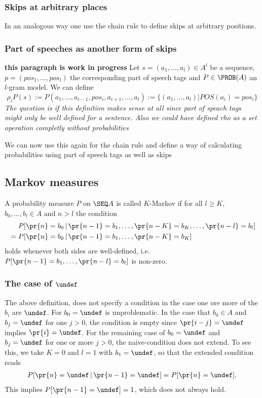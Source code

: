 \documentclass[11pt]{article}
\begin{document}
\subsubsection{Skips at arbitrary places}
In an analogous way one use the chain rule to define skips at arbitrary positions.

\subsubsection{Part of speeches as another form of skips}
\textbf{this paragraph is work in progress}
Let $s=(a_1,\dots,a_l) \in A^l$ be a sequence, $p=(pos_1,\dots,pos_l)$ the corresponding part of speech tags and $P\in \PROB (A)$ an $l$-gram model. 
We can define
\[\rho_iP(s) := P(a_1,\dots,a_{i-1},pos_i,a_{i+1},\dots,a_l):= \{ (a_1,\dots,a_l) | POS(a_i)=pos_i \}\]
\textit{The question is if this definition makes sense at all since part of speach tags might only be well defined for a sentence. Also we could have defined rho as a set operation completly without probabilities}

We can now use this again for the chain rule and define a way of calculating probabilities using part of speech tags as well as skips

\subsection{Markov measures}

A probability measure $P$ on $\SEQ A$ is called $K$-Markov if
for all $l \geq K$, $b_0,\dots,b_l \in A$ and $n > l$ the condition
\begin{align*}
  &  P[ \pr{n} = b_0 \,|\, \pr{n-1} = b_1, \dots, \pr{n-K} = b_K, \dots, \pr{n-l} = b_l ] \\  
 \;=\;&  P[ \pr{n} = b_0 \,|\, \pr{n-1} = b_1, \dots, \pr{n-K} = b_K ]
\end{align*}
holds whenever both sides are well-defined, i.e.
$P[\pr{n-1} = b_1,\dots, \pr{n-l} = b_l ]$ is non-zero.

\subsubsection{The case of $\undef$}
The above definition, does not specify a
condition in the case one ore more of the $b_i$ are $\undef$.
For $b_0=\undef$ is unproblematic. In the case that $b_0 \in A$ and $b_j =
\undef$ for one $j > 0$, the condition is empty since $\pr{i-j} =
\undef$ implies $\pr{i}=\undef$. For the remaining case 
of $b_0 = \undef$ and $b_j = \undef$ for one or more $j > 0$,
the naive-condition does not extend. To see this, we take $K=0$ and
$l=1$ with $b_1 = \undef$, so that the extended condition reads
\begin{align}
P[\pr{n} = \undef \,|\, \pr{n-1} = \undef ] = P[\pr{n} = \undef ].
\end{align}
This implies $P[\pr{n-1} = \undef] = 1$, which does not always hold.
\end{document}
